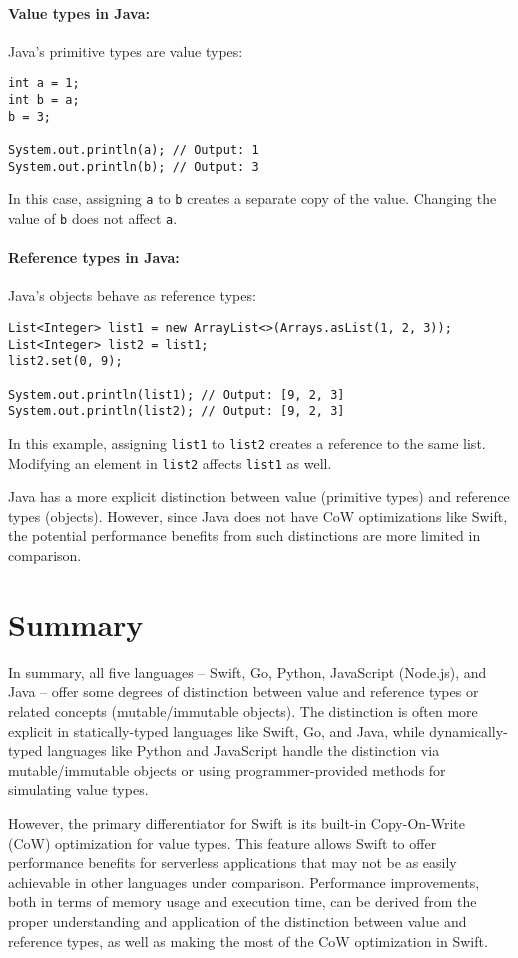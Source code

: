 \paragraph{Value types in Java:}
Java's primitive types are value types:

\begin{verbatim}
int a = 1;
int b = a;
b = 3;

System.out.println(a); // Output: 1
System.out.println(b); // Output: 3
\end{verbatim}

In this case, assigning \texttt{a} to \texttt{b} creates a separate copy of the value. Changing the value of \texttt{b} does not affect \texttt{a}.

\paragraph{Reference types in Java:}
Java's objects behave as reference types:

\begin{verbatim}
List<Integer> list1 = new ArrayList<>(Arrays.asList(1, 2, 3));
List<Integer> list2 = list1;
list2.set(0, 9);

System.out.println(list1); // Output: [9, 2, 3]
System.out.println(list2); // Output: [9, 2, 3]
\end{verbatim}

In this example, assigning \texttt{list1} to \texttt{list2} creates a reference to the same list. Modifying an element in \texttt{list2} affects \texttt{list1} as well.

Java has a more explicit distinction between value (primitive types) and reference types (objects). However, since Java does not have CoW optimizations like Swift, the potential performance benefits from such distinctions are more limited in comparison.

\section{Summary}

In summary, all five languages -- Swift, Go, Python, JavaScript (Node.js), and Java -- offer some degrees of distinction between value and reference types or related concepts (mutable/immutable objects). The distinction is often more explicit in statically-typed languages like Swift, Go, and Java, while dynamically-typed languages like Python and JavaScript handle the distinction via mutable/immutable objects or using programmer-provided methods for simulating value types.

However, the primary differentiator for Swift is its built-in Copy-On-Write (CoW) optimization for value types. This feature allows Swift to offer performance benefits for serverless applications that may not be as easily achievable in other languages under comparison. Performance improvements, both in terms of memory usage and execution time, can be derived from the proper understanding and application of the distinction between value and reference types, as well as making the most of the CoW optimization in Swift.
